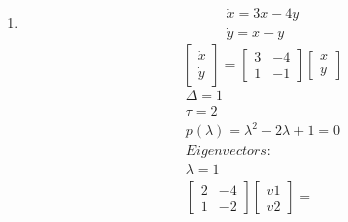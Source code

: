 \documentclass[a4paper,10pt]{article}
\begin{document}
\begin{enumerate}
\begin{enumerate}
\begin{figure}[h]
                    \label{fig:mesh1}
                \end{figure}
            \item 
                \begin{equation}
                    \begin{aligned}
                        \dot{x}= 3x-4y\\
                        \dot{y}= x- y
                    \end{aligned}
                \end{equation}
                \begin{equation}
                    \begin{bmatrix}
                        \dot{x}\\
                        \dot{y}    
                    \end{bmatrix}
                    =
                    \begin{bmatrix}
                        3 &-4\\
                        1 &-1
                    \end{bmatrix}
                    \begin{bmatrix}
                        x\\
                        y
                    \end{bmatrix}
                \end{equation}
                \begin{equation}
                    \begin{aligned}
                        \Delta=1\\
                        \tau= 2\\
                        p(\lambda)= \lambda^{2}-2\lambda +1=0\\
                        Eigenvectors:\\
                        \lambda=1\\
                        \begin{bmatrix}
                            2&-4\\
                            1 &-2
                        \end{bmatrix}
                        \begin{bmatrix}
                            v1\\
                            v2
                        \end{bmatrix}
                        =

\end{aligned}
\end{equation}
\end{enumerate}
\end{enumerate}
\end{document}
